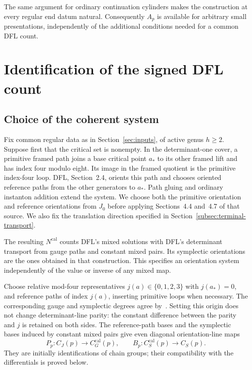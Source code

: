 \documentclass[11pt]{amsart}
\theoremstyle{definition}
\theoremstyle{remark}
\theoremstyle{plain}
\newcommand{\calib}{\mathrm{cal}}
\newcommand{\CJ}{C_J}
\newcommand{\CS}{C_S}
\begin{document}
The same argument for ordinary continuation cylinders makes the
construction at every regular end datum natural. Consequently
$A_p$ is available for arbitrary small presentations, independently
of the additional conditions needed for a common DFL count.

\section{Identification of the signed DFL count}\label{sec:mixed}

\subsection{Choice of the coherent system}
Fix common regular data as in Section~\ref{sec:inputs}, of active
genus $h\ge2$. Suppose first that the critical set is nonempty.
In the determinant-one cover, a primitive framed path joins a
base critical point $a_*$ to its other framed lift and has index
four modulo eight. Its image in the framed quotient is the
primitive index-four loop. DFL, Section~2.4, orients this path
and chooses oriented reference paths from the other generators
to $a_*$. Path gluing and ordinary instanton addition extend the
system. We choose both the primitive orientation and reference
orientations from $J_0$ before applying Sections~4.4 and~4.7 of that
source. We also fix the translation direction specified in
Section~\ref{subsec:terminal-transport}.

The resulting $N^{\calib}$ counts DFL's mixed solutions with
DFL's determinant transport from gauge paths and constant mixed
pairs. Its symplectic orientations are the ones obtained in that
construction. This specifies an orientation system independently
of the value or inverse of any mixed map.

Choose relative mod-four representatives $j(a)\in\{0,1,2,3\}$
with $j(a_*)=0$, and reference paths of index $j(a)$, inserting
primitive loops when necessary. The corresponding gauge and
symplectic degrees agree by~\cite[Proposition~2.54]{DFL}. Setting
this origin does not change determinant-line parity: the constant
difference between the parity and $j$ is retained on both sides.
The reference-path bases and the symplectic bases induced by
constant mixed pairs give even diagonal orientation-line maps
\begin{equation}\label{eq:PB}
 P_p:\CJ(p)\longrightarrow C_G^{\calib}(p),\qquad
 B_p:C_S^{\calib}(p)\longrightarrow\CS(p).
\end{equation}
They are initially identifications of chain groups; their
compatibility with the differentials is proved below.
\end{document}

